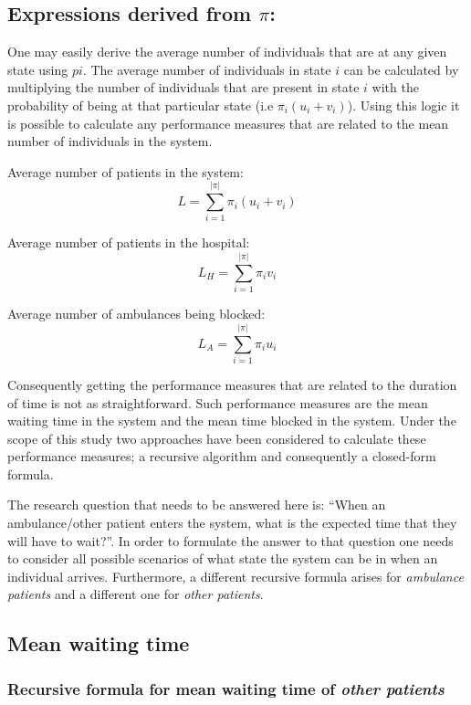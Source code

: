 \subsection{Expressions derived from \( \pi \):}
One may easily derive the average number of individuals that are at any given state 
using \( pi \). 
The average number of individuals in state \( i \) can be calculated by multiplying 
the number of individuals that are present in state \( i \) with the probability 
of being at that particular state (i.e \(\pi_i (u_i + v_i)\)). 
Using this logic it is possible to calculate any performance measures that are related 
to the mean number of individuals in the system.


Average number of patients in the system: 
\begin{equation}
    L = \sum_{i=1}^{|\pi|} \pi_i (u_i + v_i)
\end{equation} 

Average number of patients in the hospital: 
\begin{equation}
    L_H = \sum_{i=1}^{|\pi|} \pi_i v_i
\end{equation}

Average number of ambulances being blocked:
\begin{equation}
    L_A = \sum_{i=1}^{|\pi|} \pi_i u_i
\end{equation}

Consequently getting the performance measures that are related to the duration of 
time is not as straightforward. 
Such performance measures are the mean waiting time in the system and the mean time 
blocked in the system. 
Under the scope of this study two approaches have been considered to calculate these 
performance measures; a recursive algorithm and consequently a closed-form formula.

The research question that needs to be answered here is: ``When an ambulance/other 
patient enters the system, what is the expected time that they will have to wait?''. 
In order to formulate the answer to that question one needs to consider all possible 
scenarios of what state the system can be in when an individual arrives. 
Furthermore, a different recursive formula arises for \textit{ambulance patients} 
and a different one for \textit{other patients}.

\subsection{Mean waiting time}
\subsubsection{Recursive formula for mean waiting time of \textit{other patients}}

